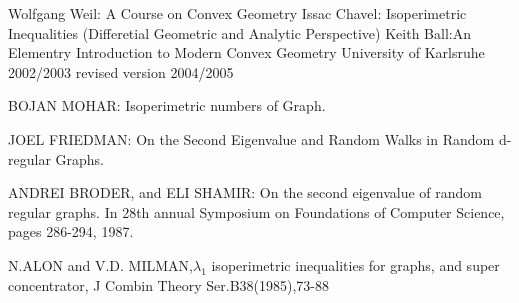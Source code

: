 \documentclass[oneside]{book}
\begin{document}
	
	\begin{thebibliography}{300}
		 \label{bib:1} 
		Wolfgang Weil: A Course
		on
		Convex Geometry
		 \label{bib:2}
		Issac Chavel: Isoperimetric Inequalities (Differetial Geometric and Analytic Perspective)
		     \label{bib:3}
		Keith Ball:An Elementry Introduction to Modern Convex Geometry
		University of Karlsruhe
		2002/2003
		revised version 2004/2005
		
		    \label{bib:4}
		BOJAN MOHAR: Isoperimetric numbers of Graph.
		
		
		
		 \label{bib:5}
		JOEL FRIEDMAN: On the Second Eigenvalue and Random Walks in Random d-regular Graphs.
		    \label{bib:6}
		
		ANDREI BRODER, and ELI SHAMIR: On the second eigenvalue of random regular graphs. In 28th annual Symposium on Foundations of Computer Science, pages 286-294, 1987. 
		
		      \label{bib:7}
		N.ALON and V.D. MILMAN,$\lambda_{1}$ isoperimetric inequalities for graphs, and super concentrator, J Combin Theory Ser.B38(1985),73-88  
	\end{thebibliography}  
	
	
	
	
	
	
	
	
	
	
	
	
	
	
	
	
	
	
	
	
	
	
	
	
	
	
	
	
	
	
	
	
	
	
	
	
	
	
	
	
	
	
	
	
	
	
	
	
	
	
	
	
	
	
	
	
	
	
	
	
	
	
	
	
	
	
	
	
	
	
	
	
	
	
	
	
	
	
	
	
	
	
\end{document}
